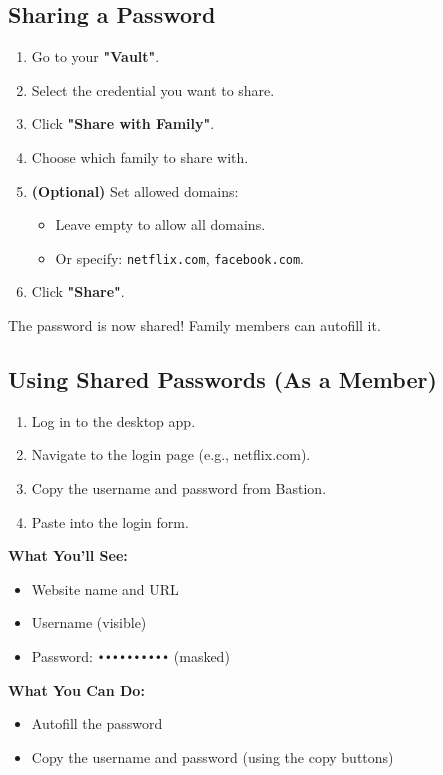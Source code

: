 \documentclass[11pt,a4paper]{article}
\begin{document}
\subsection{Sharing a Password}
\begin{enumerate}
    \item Go to your \textbf{"Vault"}.
    \item Select the credential you want to share.
    \item Click \textbf{"Share with Family"}.
    \item Choose which family to share with.
    \item \textbf{(Optional)} Set allowed domains:
    \begin{itemize}
        \item Leave empty to allow all domains.
        \item Or specify: \texttt{netflix.com}, \texttt{facebook.com}.
    \end{itemize}
    \item Click \textbf{"Share"}.
\end{enumerate}
The password is now shared! Family members can autofill it.

\subsection{Using Shared Passwords (As a Member)}
\begin{enumerate}
    \item Log in to the desktop app.
    \item Navigate to the login page (e.g., netflix.com).
    \item Copy the username and password from Bastion.
    \item Paste into the login form.
\end{enumerate}

\textbf{What You'll See:}
\begin{itemize}
    \item Website name and URL
    \item Username (visible)
    \item Password: \texttt{••••••••••} (masked)
\end{itemize}

\textbf{What You Can Do:}
\begin{itemize}
    \item Autofill the password
    \item Copy the username and password (using the copy buttons)
\end{itemize}
\end{document}
